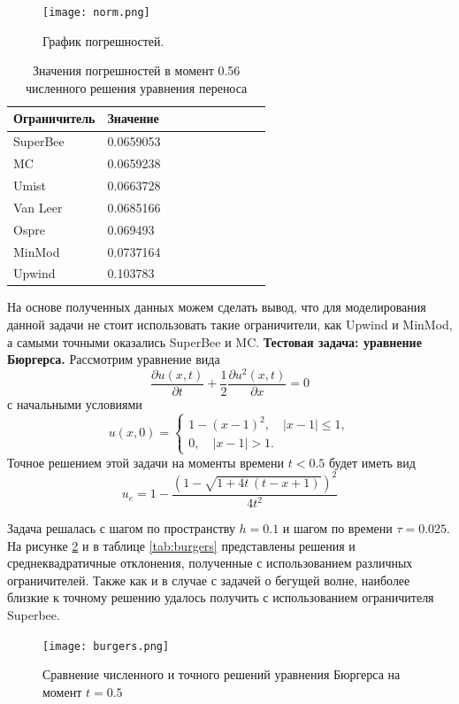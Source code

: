 \begin{figure}[h!]
    \centering
     \texttt{[image: norm.png]}
    \caption{График погрешностей.}
    \label{norms}
\end{figure}

\begin{table}[h]
\centering
\caption {Значения погрешностей в момент 0.56 численного решения уравнения переноса}
\label{tab:norms_transport}
\begin{tabular}{|l|l|c|c|c|c|c|c|c|c|}
\hline
Ограничитель & Значение \\
\hline
SuperBee & 0.0659053\\
\hline
MC &  0.0659238\\
\hline
Umist & 0.0663728\\
\hline
Van Leer & 0.0685166\\
\hline
Ospre &  0.069493\\
\hline
MinMod & 0.0737164\\
\hline
Upwind  & 0.103783\\
\hline
\end{tabular}
\end{table}


На основе полученных данных можем сделать вывод, что для моделирования данной задачи не стоит использовать такие ограничители, как
Upwind и MinMod, а самыми точными оказались SuperBee и MC.
\clearpage
{\bf Тестовая задача: уравнение Бюргерса.} Рассмотрим уравнение вида
$$
\dfrac{\partial u(x, t)}{\partial t}+\dfrac12\dfrac{\partial u^2(x, t)}{\partial x} = 0
$$
с начальными условиями
$$
u(x, 0) = \begin{cases}
	1 - (x-1)^2, \quad \left|x-1\right| \leq 1,\\
	0, \quad \left|x-1\right| > 1.
\end{cases}
$$
Точное решением этой задачи на моменты времени $t<0.5$ будет иметь вид
$$
u_e = 1-\frac{{{\left( 1-\sqrt{1+4 t\, \left( t-x+1\right) }\right) }^{2}}}{4 {{t}^{2}}}
$$

Задача решалась с шагом по пространству  $h=0.1$ и шагом по времени $\tau=0.025$.
На рисунке \ref{fig:burgers} и в таблице \ref{tab:burgers} представлены решения и среднеквадратичные отклонения, полученные с использованием различных ограничителей.
Также как и в случае с задачей о бегущей волне, наиболее близкие к точному решению удалось получить с использованием ограничителя Superbee.

\begin{figure}[h]
\centering
\texttt{[image: burgers.png]}
\caption{Сравнение численного и точного решений уравнения Бюргерса на момент $t=0.5$}
\label{fig:burgers}
\end{figure}

